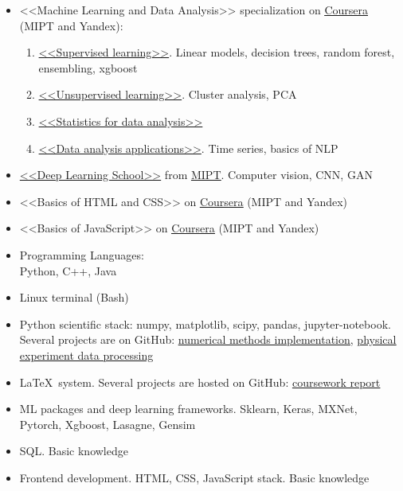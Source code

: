\begin{itemize}
\item <<Machine Learning and Data Analysis>> specialization on \href{https://www.coursera.org/specializations/machine-learning-data-analysis?}{\underline{Coursera}} (MIPT and Yandex):
\begin{enumerate}
	\item \href{https://www.coursera.org/learn/supervised-learning?specialization=machine-learning-data-analysis}{<<Supervised learning>>}. Linear models, decision trees, random forest, ensembling, xgboost
	\item \href{https://www.coursera.org/learn/unsupervised-learning?specialization=machine-learning-data-analysis}{<<Unsupervised learning>>}. Cluster analysis, PCA
	\item \href{https://www.coursera.org/learn/stats-for-data-analysis/}{<<Statistics for data analysis>>}
	\item \href{https://www.coursera.org/learn/data-analysis-applications/}{<<Data analysis applications>>}. Time series, basics of NLP
\end{enumerate}


\divider
\item \href{https://en.dlschool.org/}{<<Deep Learning School>>} from \href{https::/mipt.ru/en}{\underline{MIPT}}. Computer vision, CNN, GAN
\item <<Basics of HTML and CSS>> on \href{https://www.coursera.org/learn/snovy-html-i-css?specialization=razrabotka-interfeysov}{\underline{Coursera}} (MIPT and Yandex)
\item <<Basics of JavaScript>> on \href{https://www.coursera.org/learn/javascript-osnovy-i-funktsii}{\underline{Coursera}} (MIPT and Yandex)

\end{itemize}



\begin{itemize}
	\item Programming Languages: \\ 
	Python, C++, Java
	\item Linux terminal (Bash)
	\item Python scientific stack: 
	numpy, matplotlib, scipy, pandas, jupyter-notebook. Several projects are on GitHub: \href{https://github.com/stdereka/calc\_math\_hometask}{\underline{numerical methods implementation},} \href{https://github.com/stdereka/PRM\_MIPT}{\underline{physical experiment data processing}}
	\item \LaTeX~system. Several projects are hosted on GitHub: \href{https://github.com/stdereka/yavor\_curse}{\underline{coursework report}}
	\item ML packages and deep learning frameworks. Sklearn, Keras, MXNet, Pytorch, Xgboost, Lasagne,
	Gensim
	\item SQL. Basic knowledge
	\item Frontend development. HTML, CSS, JavaScript stack. Basic knowledge
\end{itemize}

